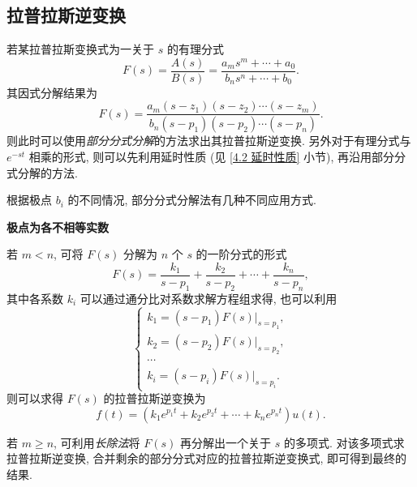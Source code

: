 \subsection{拉普拉斯逆变换} \label{4 拉普拉斯逆变换}
若某拉普拉斯变换式为一关于 $s$ 的有理分式
\begin{equation}
    F(s)=\frac{A(s)}{B(s)}=\frac{a_ms^m+\cdots+a_0}{b_ns^n+\cdots+b_0}.
\end{equation}
其因式分解结果为
\begin{equation}
    F(s)=\frac{a_m(s-z_1)(s-z_2)\cdots(s-z_m)}{b_n(s-p_1)(s-p_2)\cdots(s-p_n)}.
\end{equation}
则此时可以使用\textit{部分分式分解}的方法求出其拉普拉斯逆变换. 另外对于有理分式与 $e^{-st}$ 相乘的形式, 则可以先利用延时性质 (见 \ref{4.2 延时性质} 小节), 再沿用部分分式分解的方法.

根据极点 $b_i$ 的不同情况, 部分分式分解法有几种不同应用方式.

\textbf{极点为各不相等实数}

若 $m<n$, 可将 $F(s)$ 分解为 $n$ 个 $s$ 的一阶分式的形式
\begin{equation}
    F(s)=\frac{k_1}{s-p_1}+\frac{k_2}{s-p_2}+\cdots+\frac{k_n}{s-p_n},
\end{equation}
其中各系数 $k_i$ 可以通过通分比对系数求解方程组求得, 也可以利用
\begin{equation} \label{eq:4.3 partial fraction k}
    \begin{cases}
        k_1=(s-p_1)F(s)|_{s=p_1}, \\
        k_2=(s-p_2)F(s)|_{s=p_2}, \\
        \cdots                    \\
        k_i=(s-p_i)F(s)|_{s=p_i}.
    \end{cases}
\end{equation}
则可以求得 $F(s)$ 的拉普拉斯逆变换为
\begin{equation}
    f(t)=(k_1e^{p_1t}+k_2e^{p_2t}+\cdots+k_ne^{p_nt})u(t).
\end{equation}

若 $m\geq n$, 可利用\textit{长除法}将 $F(s)$ 再分解出一个关于 $s$ 的多项式. 对该多项式求拉普拉斯逆变换, 合并剩余的部分分式对应的拉普拉斯逆变换式, 即可得到最终的结果.

